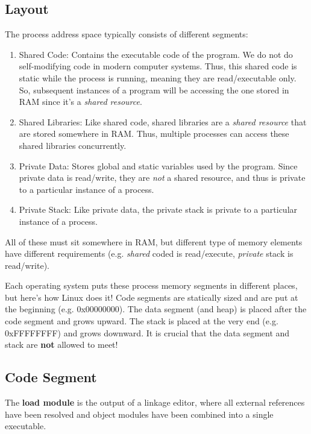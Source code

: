 \documentclass{report}
\newcommand{\definitionBegin}[1]{\begin{tcolorbox}[title={Definition: #1}]}
\newcommand{\definitionEnd}{\end{tcolorbox}}
\newcommand{\exampleBegin}[1]{\begin{tcolorbox}[colback=blue!5!white,colframe=black!75!blue,title={Example:
      #1}]}
\newcommand{\exampleEnd}{\end{tcolorbox}}
\begin{document}
\subsection{Layout}
The process address space typically consists of different segments:
\begin{enumerate}[label=\textit{(\roman*)}]
\item Shared Code: Contains the executable code of the program. We do not do self-modifying code in
  modern computer systems. Thus, this shared code is static while the process is running, meaning
  they are read/executable only. So, subsequent instances of a program will be accessing the one
  stored in RAM since it's a \textit{shared resource}.
\item Shared Libraries: Like shared code, shared libraries are a \textit{shared resource} that are
  stored somewhere in RAM. Thus, multiple processes can access these shared libraries concurrently.
\item Private Data: Stores global and static variables used by the program. Since private data is
  read/write, they are \textit{not} a shared resource, and thus is private to a particular instance
  of a process.
\item Private Stack: Like private data, the private stack is private to a particular instance of a process.
\end{enumerate}
All of these must sit somewhere in RAM, but different type of memory elements have different
requirements (e.g. \textit{shared} coded is read/execute, \textit{private} stack is
read/write). 

\exampleBegin{Linux Layout}
Each operating system puts these process memory segments in different places, but here's how Linux
does it! Code segments are statically sized and are put at the beginning (e.g. 0x00000000). The data
segment (and heap) is placed after the code segment and grows upward. The stack is placed at the
very end (e.g. 0xFFFFFFFF) and grows downward. It is crucial that the data segment and stack are
\textbf{not} allowed to meet! 
\exampleEnd


\subsection{Code Segment}
\definitionBegin{Load Module}
The \textbf{load module} is the output of a linkage editor, where all external references have been
resolved and object modules have been combined into a single executable.
\definitionEnd
\end{document}
